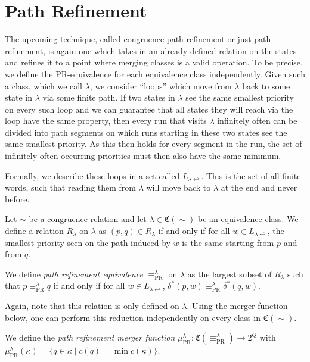
\section{Path Refinement}

The upcoming technique, called congruence path refinement or just path refinement, is again one which takes in an already defined relation on the states and refines it to a point where merging classes is a valid operation. To be precise, we define the PR-equivalence for each equivalence class independently. 
Given such a class, which we call $\lambda$, we consider \enquote{loops} which move from $\lambda$ back to some state in $\lambda$ via some finite path. If two states in $\lambda$ see the same smallest priority on every such loop and we can guarantee that all states they will reach via the loop have the same property, then every run that visits $\lambda$ infinitely often can be divided into path segments on which runs starting in these two states see the same smallest priority. As this then holds for every segment in the run, the set of infinitely often occurring priorities must then also have the same minimum.

Formally, we describe these loops in a set called $L_{\lambda \hookleftarrow}$. This is the set of all finite words, such that reading them from $\lambda$ will move back to $\lambda$ at the end and never before.

\begin{definition}
	Let $\sim$ be a congruence relation and let $\lambda \in \mathfrak{C}(\sim)$ be an equivalence class. We define a relation $R_\lambda$ on $\lambda$ as $(p, q) \in R_\lambda$ if and only if for all $w \in L_{\lambda \hookleftarrow}$, the smallest priority seen on the path induced by $w$ is the same starting from $p$ and from $q$.
	
	We define \emph{path refinement equivalence} $\equiv_\text{PR}^\lambda$ on $\lambda$ as the largest subset of $R_\lambda$ such that $p \equiv_\text{PR}^\lambda q$ if and only if for all $w \in L_{\lambda \hookleftarrow}$, $\delta^*(p, w) \equiv_\text{PR}^\lambda \delta^*(q, w)$.
\end{definition}

Again, note that this relation is only defined on $\lambda$. Using the merger function below, one can perform this reduction independently on every class in $\mathfrak{C}(\sim)$. 

\begin{definition}
	We define the \emph{path refinement merger function} $\mu_\text{PR}^\lambda : \mathfrak{C}(\equiv_\text{PR}^\lambda) \rightarrow 2^Q$ with $\mu_\text{PR}^\lambda(\kappa) = \{q \in \kappa \mid c(q) = \min c(\kappa) \}$.
\end{definition}

